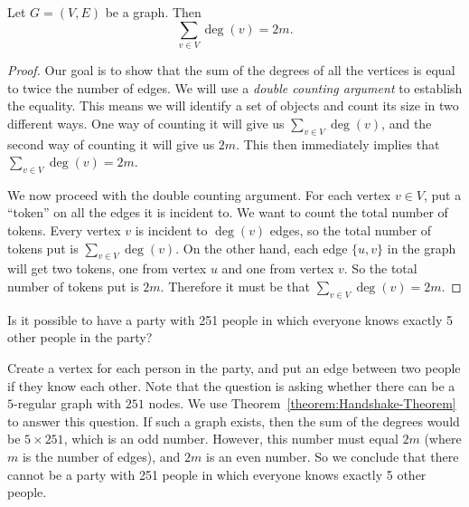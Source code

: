 \begin{flex}
\label{grp:theorem:Handshake-Theorem}

\begin{theorem}
\label{theorem:Handshake-Theorem}
Let $G=(V,E)$ be a graph. Then 
\[
\sum_{v \in V} \deg(v) = 2m.
\]

\end{theorem}

\begin{proof}
\label{prf:intro-to-graph-theory::goal}
Our goal is to show that the sum of the degrees of all the vertices is equal to twice the number of edges. We will use a \emph{double counting argument} to establish the equality. This means we will identify a set of objects and count its size in two different ways. One way of counting it will give us $\sum_{v \in V} \deg(v)$, and the second way of counting it will give us $2m$. This then immediately implies that $\sum_{v \in V} \deg(v) = 2m$.

We now proceed with the double counting argument. For each vertex $v \in V$, put a ``token'' on all the edges it is incident to. We want to count the total number of tokens. Every vertex $v$ is incident to $\deg(v)$ edges, so the total number of tokens put is $\sum_{v \in V} \deg(v)$. On the other hand, each edge $\{u,v\}$ in the graph will get two tokens, one from vertex $u$ and one from vertex $v$. So the total number of tokens put is $2m$. Therefore it must be that $\sum_{v \in V} \deg(v) = 2m$.

\end{proof}
\end{flex}

\begin{flex}
\label{grp:exercise:Application-of-Handshake-Theorem}

\begin{exercise}
\label{exercise:Application-of-Handshake-Theorem}
Is it possible to have a party with 251 people in which everyone knows exactly 5 other people in the party?

\end{exercise}

\begin{solution}
\label{sol:intro-to-graph-theory::create}
Create a vertex for each person in the party, and put an edge between two people if they know each other. Note that the question is asking whether there can be a $5$-regular graph with $251$ nodes. We use Theorem~\ref{theorem:Handshake-Theorem} to answer this question. If such a graph exists, then the sum of the degrees would be $5 \times 251$, which is an odd number. However, this number must equal $2m$ (where $m$ is the number of edges), and $2m$ is an even number. So we conclude that there cannot be a party with 251 people in which everyone knows exactly 5 other people.

\end{solution}
\end{flex}

